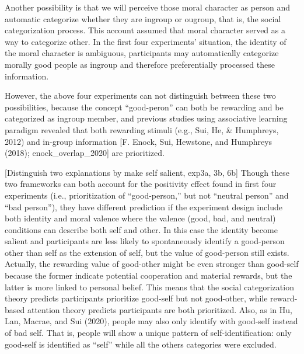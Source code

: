 \documentclass[
  english,
  man]{apa6}
\begin{document}
Another possibility is that we will perceive those moral character as person and automatic categorize whether they are ingroup or ougroup, that is, the social categorization process. This account assumed that moral character served as a way to categorize other. In the first four experiments' situation, the identity of the moral character is ambiguous, participants may automatically categorize morally good people as ingroup and therefore preferentially processed these information.

However, the above four experiments can not distinguish between these two possibilities, because the concept ``good-peron'' can both be rewarding and be categorized as ingroup member, and previous studies using associative learning paradigm revealed that both rewarding stimuli (e.g., Sui, He, \& Humphreys, 2012) and in-group information {[}F. Enock, Sui, Hewstone, and Humphreys (2018); enock\_overlap\_2020{]} are prioritized.

{[}Distinguish two explanations by make self salient, exp3a, 3b, 6b{]} Though these two frameworks can both account for the positivity effect found in first four experiments (i.e., prioritization of ``good-person,'' but not ``neutral person'' and ``bad person''), they have different prediction if the experiment design include both identity and moral valence where the valence (good, bad, and neutral) conditions can describe both self and other. In this case the identity become salient and participants are less likely to spontaneously identify a good-person other than self as the extension of self, but the value of good-person still exists. Actually, the rewarding value of good-other might be even stronger than good-self because the former indicate potential cooperation and material rewards, but the latter is more linked to personal belief. This means that the social categorization theory predicts participants prioritize good-self but not good-other, while reward-based attention theory predicts participants are both prioritized. Also, as in Hu, Lan, Macrae, and Sui (2020), people may also only identify with good-self instead of bad self. That is, people will show a unique pattern of self-identification: only good-self is identified as ``self'' while all the others categories were excluded.
\end{document}
